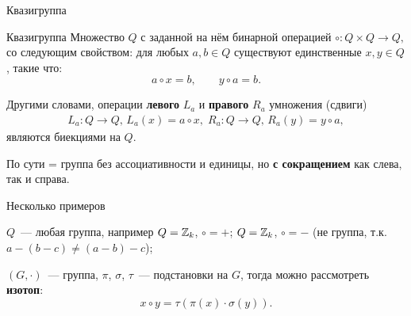 \begin{frame}{Квазигруппа}
    \begin{myexample}{Квазигруппа}
        Множество $Q$ с заданной на нём бинарной операцией
        \(
          \circ \colon Q \times Q \to Q, 
        \)
        со следующим свойством: для любых $a, b \in Q$ существуют единственные $x, y \in Q$, такие что:
        \[
          a \circ x = b, \qquad y \circ a = b.
        \]
    \end{myexample}

    \pause
    Другими словами, операции \textbf{левого} $L_a$ и \textbf{правого} $R_a$ умножения (сдвиги)
    \begin{gather*}
        L_a \colon Q \to Q,\, L_a(x) = a \circ x, \; R_a \colon Q \to Q,\, R_a(y) = y \circ a,
    \end{gather*}
    являются биекциями на $Q$.
    
    \pause 
    По сути = группа без ассоциативности и единицы, но \textbf{с сокращением} как слева, так и справа.
\end{frame}


\begin{frame}{Несколько примеров}
    \begin{coloritemize}
        \item $Q$~--- любая группа, например $Q = \mathbb{Z}_k$, $\circ = +$; $Q = \mathbb{Z}_k$, $\circ = -$ (не группа, т.к. $a - (b - c) \ne (a - b) - c$);
        \pause
        \item $(G, \cdot)$~--- группа, $\pi$, $\sigma$, $\tau$~--- подстановки на $G$, тогда можно рассмотреть \textbf{изотоп}:
        \[
            x \circ y = \tau(\pi(x) \cdot \sigma(y)).
        \]
    \end{coloritemize}
\end{frame}




